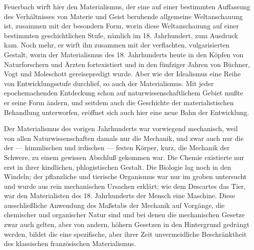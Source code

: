 Feuerbach wirft hier den Materialismus, der eine auf einer
bestimmten Auffassung des Verhältnisses von Materie und Geist beruhende
allgemeine Weltanschauung ist, zusammen mit der besondern Form, worin
diese Weltanschauung auf einer bestimmten geschichtlichen Stufe, nämlich
im 18. Jahrhundert, zum Ausdruck kam. Noch mehr, er wirft ihn zusammen
mit der verflachten, vulgarisierten Gestalt, worin der Materialismus des
18. Jahrhunderts heute in den Köpfen von Naturforschern und Ärzten
fortexistiert und in den fünfziger Jahren von Büchner, Vogt und
Moleschott gereisepredigt wurde. Aber wie der Idealismus eine Reihe von
Entwicklungsstufe durchlief, so auch der Materialismus. Mit jeder
epochemachenden Entdeckung schon auf naturwissenschaftlichem Gebiet
mußte er seine Form ändern, und seitdem auch die Geschichte der
materialistischen Behandlung unterworfen, eröffnet sich auch hier eine
neue Bahn der Entwicklung.

Der Materialismus des vorigen Jahrhunderts war vorwiegend
mechanisch, weil von allen Naturwissenschaften damals nur die Mechanik,
und zwar auch nur die der --- himmlischen und irdischen --- festen Körper,
kurz, die Mechanik der Schwere, zu einem gewissen Abschluß gekommen war.
Die Chemie existierte nur erst in ihrer kindlichen, phlogistischen
Gestalt. Die Biologie lag noch in den Windeln; der pflanzliche und
tierische Organismus war nur im groben untersucht und wurde aus rein
mechanischen Ursachen erklärt; wie dem Descartes das Tier, war den
Materialisten des 18. Jahrhunderts der Mensch eine Maschine. Diese
ausschließliche Anwendung des Maßstabs der Mechanik auf Vorgänge, die
chemischer und organischer Natur sind und bei denen die mechanischen
Gesetze zwar auch gelten, aber von andern, höhern Gesetzen in den
Hintergrund gedrängt werden, bildet die eine spezifische, aber ihrer
Zeit unvermeidliche Beschränktheit des klassischen französischen
Materialismus.

